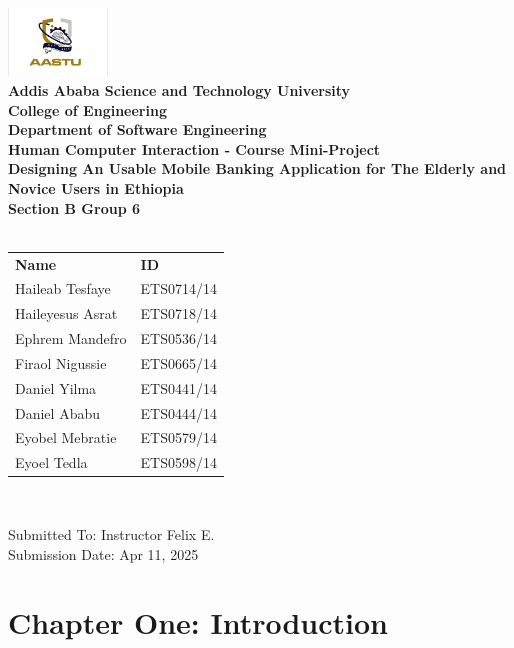 \documentclass[a4paper,12pt]{report}
\begin{document}
\begin{titlepage}
  \centering
  \includegraphics[width=100px]{../../shared/images/aastu_logo.png} \\
  {\large\bfseries Addis Ababa Science and Technology University} \\
  {\large\bfseries College of Engineering} \\
  {\large\bf Department of Software Engineering} \\[5mm]
  {\Large\bf Human Computer Interaction - Course Mini-Project} \\[5mm]
  {\Huge\bfseries Designing An Usable Mobile Banking Application for The Elderly and Novice Users in Ethiopia} \\ [2cm]
  {\Large\bfseries Section B Group 6 } \\[2mm]
  {\Large\bfseries{}} \\ [5mm]
  \begin{tabular}{ll}
    \large\textbf{Name}     & \large\textbf{ID} \\
    \large Haileab Tesfaye  & \large ETS0714/14 \\
    \large Haileyesus Asrat & \large ETS0718/14 \\
    \large Ephrem Mandefro  & \large ETS0536/14 \\
    \large Firaol Nigussie  & \large ETS0665/14 \\
    \large Daniel Yilma     & \large ETS0441/14 \\
    \large Daniel Ababu     & \large ETS0444/14 \\
    \large Eyobel Mebratie  & \large ETS0579/14 \\
    \large Eyoel Tedla      & \large ETS0598/14 \\
  \end{tabular} \\[4cm]

  \begin{flushright}
    {\large Submitted To: Instructor Felix E.}\\
    {\large Submission Date: Apr 11, 2025}
  \end{flushright}

\end{titlepage}
\tableofcontents
\chapter*{Chapter One: Introduction}
\setcounter{chapter}{1}
\setcounter{page}{1}
\end{document}
